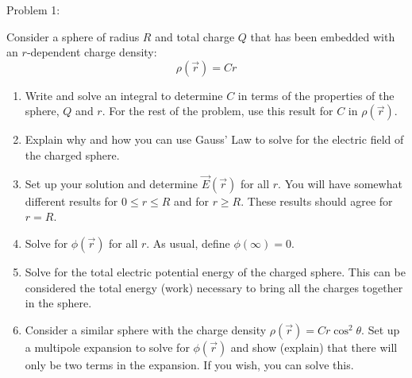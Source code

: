 



\begin{Problem}{Problem 1:}{
Consider a sphere of radius $R$ and total charge $Q$ that has been embedded with an $r$‐dependent charge density:
\begin{equation*}
\rho(\vec{r}) = Cr
\end{equation*}
\begin{enumerate}[label=(\alph*)]
\item Write and solve an integral to determine $C$ in terms of the properties of the sphere, $Q$ and $r$. For the rest of the problem, use this result for $C$ in $\rho(\vec{r})$.
\item Explain why and how you can use Gauss’ Law to solve for the electric field of the charged sphere.
\item Set up your solution and determine $\vec{E}(\vec{r})$ for all $r$. You will have somewhat different results for $0 \leq r \leq R$ and for $r \geq R$. These results should agree for $r = R$.
\item Solve for $\phi(\vec{r})$ for all $r$. As usual, define $\phi(\infty)=0$.
\item Solve for the total electric potential energy of the charged sphere. This can be considered the total energy (work) necessary to bring all the charges together in the sphere.
\item Consider a similar sphere with the charge density $\rho(\vec{r}) = Cr\cos^{2}{\theta}$. Set up a multipole expansion to solve for $\phi(\vec{r})$ and show (explain) that there will only be two terms in the expansion. If you wish, you can solve this.
\end{enumerate}
}
\end{Problem}
